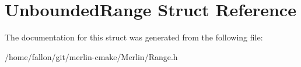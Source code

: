 \hypertarget{structUnboundedRange}{}\section{Unbounded\+Range Struct Reference}
\label{structUnboundedRange}


The documentation for this struct was generated from the following file\+:\begin{DoxyCompactItemize}
\item 
/home/fallon/git/merlin-\/cmake/\+Merlin/Range.\+h\end{DoxyCompactItemize}
